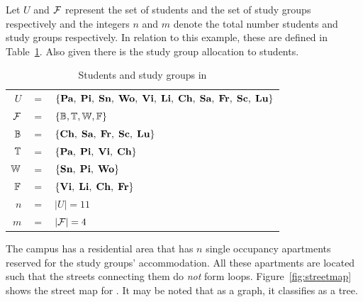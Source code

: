 Let $U$ and ${\cal F}$ represent the set of students and the set of study
groups respectively and the integers $n$ and $m$ denote the total
number students and study groups respectively. In relation to this
example, these are defined in Table~\ref{tab:wsigroups}. Also given
there is the study group allocation to students.
 
\begin{table}[t]%
  \centering
  { \footnotesize
    \begin{tabular}{rcl}
      $U $&$=$&$ \{\textbf{Pa},\; \textbf{Pi},\; \textbf{Sn},\; \textbf{Wo},\; \textbf{Vi},\; \textbf{Li},\; \textbf{Ch},\;
      \textbf{Sa},\; \textbf{Fr},\; \textbf{Sc},\; \textbf{Lu}\}$\\
      ${\cal F} $&$=$&$ \{\mathbb{B}, \mathbb{T}, \mathbb{W}, \mathbb{F}\}$\\
      $\mathbb{B} $&$=$&$ \{\textbf{Ch},\;  \textbf{Sa},\;  \textbf{Fr},\;  \textbf{Sc},\;  \textbf{Lu} \}$\\
      $\mathbb{T} $&$=$&$ \{\textbf{Pa},\;  \textbf{Pi},\;  \textbf{Vi},\;  \textbf{Ch} \}$\\
      $\mathbb{W} $&$=$&$ \{\textbf{Sn},\;  \textbf{Pi},\;  \textbf{Wo} \}$\\
      $\mathbb{F} $&$=$&$ \{\textbf{Vi},\;  \textbf{Li},\;  \textbf{Ch},\;  \textbf{Fr} \}$\\
      $n $&$=$&$ |U| = 11$\\
      $m $&$=$&$ |{\cal F}| = 4$      
    \end{tabular}
  }
  \caption{\figtabsize Students and study groups in \WSI}
  \label{tab:wsigroups}
\end{table}

The campus has a residential area {\residenceblock} that has $n$
single occupancy apartments reserved for the study groups'
accommodation.  All these apartments are located such that the streets
connecting them do {\em not} form loops. Figure~\ref{fig:streetmap} shows
the street map for {\residenceblock}. It may be noted that as a graph,
it classifies as a tree.


